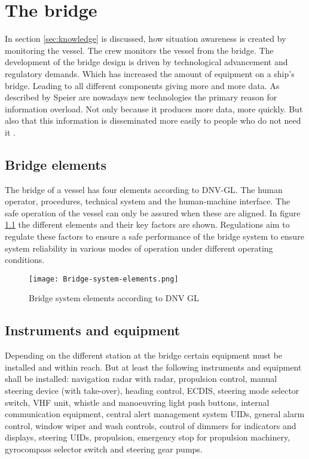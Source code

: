 \chapter{The bridge}
In section \ref{sec:knowledge} is discussed, how situation awareness is created by monitoring the vessel. The crew monitors the vessel from the bridge. The development of the bridge design is driven by technological advancement and regulatory demands. Which has increased the amount of equipment on a ship's bridge. Leading to all different components giving more and more data. As described by Speier are nowadays new technologies the primary reason for information overload. Not only because it produces more data, more quickly. But also that this information is disseminated more easily to people who do not need it \cite{Speier1999}. 

\section{Bridge elements}
The bridge of a vessel has four elements according to DNV-GL. The human operator, procedures, technical system and the human-machine interface. The safe operation of the vessel can only be assured when these are aligned. In figure \ref{fig:Bridge-system-elements} the different elements and their key factors are shown. Regulations aim to regulate these factors to ensure a safe performance of the bridge system to ensure system reliability in various modes of operation under different operating conditions. \cite{DNVGL2011}

\begin{figure}[hb]
	\centering
	\texttt{[image: Bridge-system-elements.png]}
	\caption{Bridge system elements according to DNV GL}
	\label{fig:Bridge-system-elements}
\end{figure}

\section{Instruments and equipment}
Depending on the different station at the bridge certain equipment must be installed and within reach. But at least the following instruments and equipment shall be installed: navigation radar with radar, propulsion control, manual steering device (with take-over), heading control, \ac{ECDIS}, steering mode selector switch, \ac{VHF} unit, whistle and manoeuvring light push buttons, internal communication equipment, central alert management system \ac{UID}s, general alarm control, window wiper and wash controls, control of dimmers for indicators and displays, steering \ac{UID}s, propulsion, emergency stop for propulsion machinery, gyrocompass selector switch and steering gear pumps.


